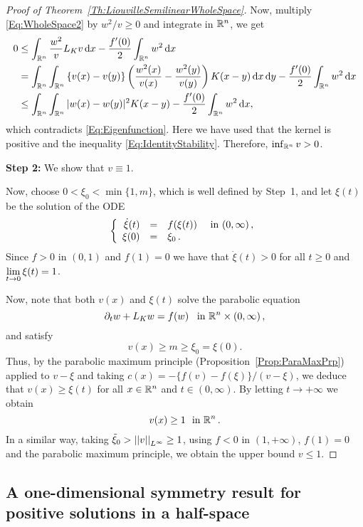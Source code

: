 \begin{proof}[Proof of Theorem~\ref{Th:LiouvilleSemilinearWholeSpace}]
Now, multiply \eqref{Eq:WholeSpace2} by $w^2/v\geq 0$ and integrate in $\mathbb{R}^n$, we get
\begin{align*}
0 &\leq \int_{\mathbb{R}^n} \frac{w^2}{v}  L_K v \,\mathrm{d} x - \frac{f'(0)}{2}\int_{\mathbb{R}^n} w^2 \,\mathrm{d} x \\
&= \int_{\mathbb{R}^n}\int_{\mathbb{R}^n}\left\{ v(x)-v(y) \right\} \left( \frac{w^2(x)}{v(x)}-\frac{w^2(y)}{v(y)} \right) K(x-y) \,\mathrm{d} x \,\mathrm{d} y - \frac{f'(0)}{2}\int_{\mathbb{R}^n} w^2 \,\mathrm{d} x \\
&\leq \int_{\mathbb{R}^n}\int_{\mathbb{R}^n} |w(x)-w(y)|^2 K(x-y) - \frac{f'(0)}{2}\int_{\mathbb{R}^n} w^2 \,\mathrm{d} x ,
\end{align*}
which contradicts \eqref{Eq:Eigenfunction}. Here we have used that the kernel is positive and the inequality \eqref{Eq:IdentityStability}. Therefore, $\inf_{\mathbb{R}^n} v >0$.

\textbf{Step 2:} We show that $v\equiv 1$.

Now, choose $0<\xi_0<\min\{1,m\}$, which is well defined by Step~1, and let $\xi(t)$ be the solution of the ODE
$$
\left\{\begin{array}{rcll}
\dot{\xi}(t) &=& f(\xi(t)) & \textrm{ in }(0,\infty)\,,\\
\xi(0) &=& \xi_0\,.
\end{array} \right.
$$
Since $f>0$ in $(0,1)$ and $f(1) = 0$ we have that $\dot{\xi}(t)>0$ for all $t\geq 0$ and $\displaystyle \lim_{t\to 0} \xi(t) = 1$.

Now, note that both $v(x)$ and $\xi(t)$ solve the parabolic equation
$$ \partial_t w + L_K w = f(w) \,\,\, \textrm{ in }\mathbb{R}^n\times (0,\infty)\,, $$
and satisfy
$$ v(x) \geq m \geq \xi_0 = \xi(0). $$
Thus, by the parabolic maximum principle (Proposition~\ref{Prop:ParaMaxPrp}) applied to $v-\xi$ and taking $c(x) = -\{f(v)-f(\xi)\}/(v-\xi)$, we deduce that $v(x)\geq \xi(t)$ for all $x\in\mathbb{R}^n$ and $t\in(0,\infty)$. By letting $t \to +\infty$ we obtain
$$
 v(x) \geq 1 \,\, \textrm{ in }\mathbb{R}^n\,.  
$$
In a similar way, taking $\tilde{\xi}_0>\left | \left |{v} \right | \right |_{L^\infty} \geq 1$, using $f<0$ in $(1,+\infty)$, $f(1)=0$ and the parabolic maximum principle, we obtain the upper bound $v\leq 1$.

\end{proof}



\subsection{A one-dimensional symmetry result for positive solutions in a half-space}


